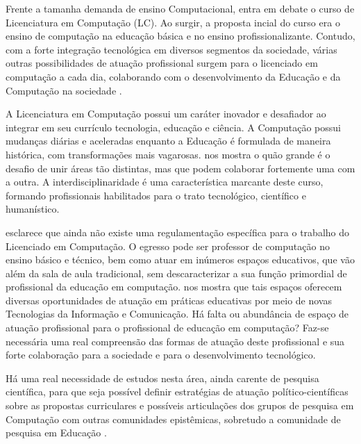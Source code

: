 Frente a tamanha demanda de ensino Computacional, entra em debate o curso de Licenciatura em Computação (LC). Ao surgir, a proposta incial do curso era o ensino de computação na educação básica e no ensino profissionalizante. Contudo, com a forte integração tecnológica em diversos segmentos da sociedade, várias outras possibilidades de atuação profissional surgem para o licenciado em computação a cada dia, colaborando com o desenvolvimento da Educação e da Computação na sociedade \citep{castro2013b}. 


A Licenciatura em Computação possui um caráter inovador e desafiador ao integrar em seu currículo tecnologia, educação e ciência. A Computação possui mudanças diárias e aceleradas enquanto a Educação é formulada de maneira histórica, com transformações mais vagarosas. \citet{matos2013a} nos mostra o quão grande é o desafio de unir áreas tão distintas, mas que podem colaborar fortemente uma com a outra. A interdisciplinaridade é uma característica marcante deste curso, formando profissionais habilitados para o trato tecnológico, científico e humanístico.


\citet{cabral08} esclarece que ainda não existe uma regulamentação específica para o trabalho do Licenciado em Computação. O egresso pode ser professor de computação no ensino básico e técnico, bem como atuar em inúmeros espaços educativos, que vão além da sala de aula tradicional, sem descaracterizar a sua função primordial de profissional da educação em computação. \citet{castro2013a} nos mostra que tais espaços oferecem diversas oportunidades de atuação em práticas educativas por meio de novas Tecnologias da Informação e Comunicação. Há falta ou abundância de espaço de atuação profissional para o profissional de educação em computação? Faz-se necessária uma real compreensão das formas de atuação deste profissional e sua forte colaboração para a sociedade e para o desenvolvimento tecnológico. 

Há uma real necessidade de estudos nesta área, ainda carente de pesquisa científica, para que seja possível definir estratégias de atuação político-científicas sobre as propostas curriculares e possíveis articulações dos grupos de pesquisa em Computação com outras comunidades epistêmicas, sobretudo a comunidade de pesquisa em Educação \citep{matos2013a}.



